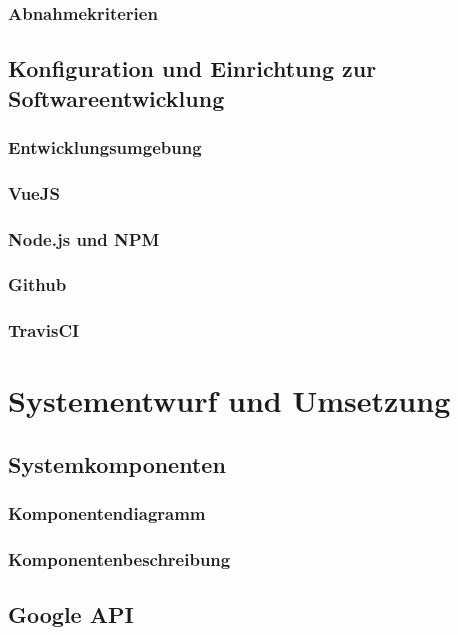 \documentclass[a4paper, 11pt]{scrreprt}
\begin{document}
\subsection{Abnahmekriterien}

\section{Konfiguration und Einrichtung zur Softwareentwicklung}

\subsection{Entwicklungsumgebung}

\subsection{VueJS}

\subsection{Node.js und NPM}

\subsection{Github}

\subsection{TravisCI}


\chapter{Systementwurf und Umsetzung}

\section{Systemkomponenten}

\subsection{Komponentendiagramm}

\subsection{Komponentenbeschreibung}

\section{Google API}
\end{document}
